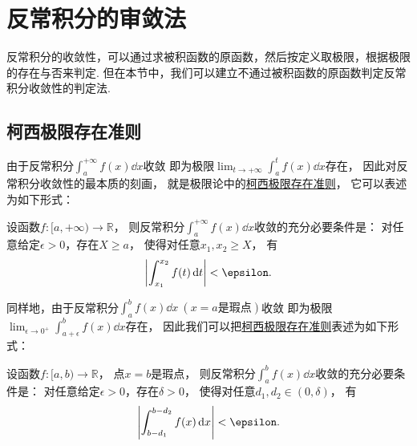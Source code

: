 \section{反常积分的审敛法}
反常积分的收敛性，可以通过求被积函数的原函数，然后按定义取极限，根据极限的存在与否来判定.
但在本节中，我们可以建立不通过被积函数的原函数判定反常积分收敛性的判定法.

\subsection{柯西极限存在准则}
由于反常积分\(\int_a^{+\infty} f(x) \dd{x}\)收敛
即为极限\(\lim_{t\to+\infty} \int_a^t f(x) \dd{x}\)存在，
因此对反常积分收敛性的最本质的刻画，
就是极限论中的\hyperref[theorem:极限.函数的柯西极限存在准则]{柯西极限存在准则}，
它可以表述为如下形式：
\begin{theorem}\label{theorem:反常积分.柯西极限存在准则}
设函数\(f\colon[a,+\infty)\to\mathbb{R}\)，
则反常积分\(\int_a^{+\infty} f(x) \dd{x}\)收敛的充分必要条件是：
对任意给定\(\epsilon>0\)，存在\(X \geq a\)，
使得对任意\(x_1,x_2 \geq X\)，
有\begin{equation*}
	\abs{\int_{x_1}^{x_2} f(t) \dd{t}} < \epsilon.
\end{equation*}
\end{theorem}

同样地，由于反常积分\(\int_a^b f(x) \dd{x}\ (\text{$x=a$是瑕点})\)收敛
即为极限\(\lim_{\epsilon\to0^+} \int_{a+\epsilon}^b f(x) \dd{x}\)存在，
因此我们可以把\hyperref[theorem:极限.函数的柯西极限存在准则]{柯西极限存在准则}表述为如下形式：
\begin{theorem}
设函数\(f\colon[a,b)\to\mathbb{R}\)，
点\(x=b\)是瑕点，
则反常积分\(\int_a^b f(x) \dd{x}\)收敛的充分必要条件是：
对任意给定\(\epsilon>0\)，存在\(\delta>0\)，
使得对任意\(d_1,d_2\in(0,\delta)\)，
有\begin{equation*}
	\abs{\int_{b-d_1}^{b-d_2} f(x) \dd{x}} < \epsilon.
\end{equation*}
\end{theorem}

